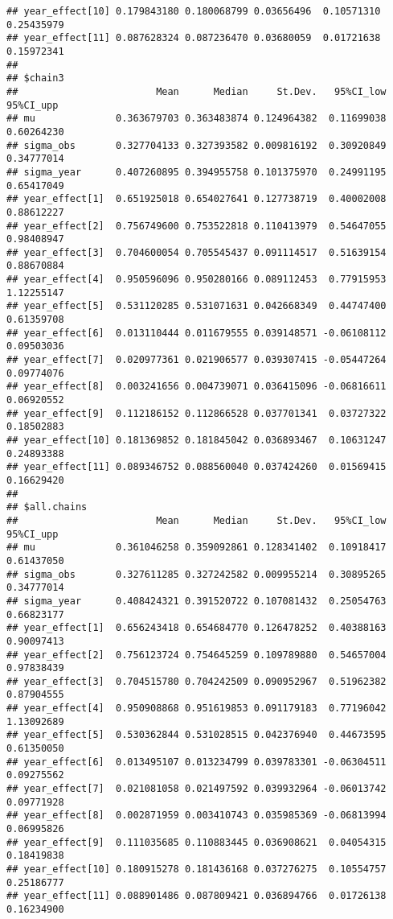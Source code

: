 \documentclass[
]{article}
\begin{document}
\begin{verbatim}
## year_effect[10] 0.179843180 0.180068799 0.03656496  0.10571310 0.25435979
## year_effect[11] 0.087628324 0.087236470 0.03680059  0.01721638 0.15972341
## 
## $chain3
##                        Mean      Median     St.Dev.   95%CI_low  95%CI_upp
## mu              0.363679703 0.363483874 0.124964382  0.11699038 0.60264230
## sigma_obs       0.327704133 0.327393582 0.009816192  0.30920849 0.34777014
## sigma_year      0.407260895 0.394955758 0.101375970  0.24991195 0.65417049
## year_effect[1]  0.651925018 0.654027641 0.127738719  0.40002008 0.88612227
## year_effect[2]  0.756749600 0.753522818 0.110413979  0.54647055 0.98408947
## year_effect[3]  0.704600054 0.705545437 0.091114517  0.51639154 0.88670884
## year_effect[4]  0.950596096 0.950280166 0.089112453  0.77915953 1.12255147
## year_effect[5]  0.531120285 0.531071631 0.042668349  0.44747400 0.61359708
## year_effect[6]  0.013110444 0.011679555 0.039148571 -0.06108112 0.09503036
## year_effect[7]  0.020977361 0.021906577 0.039307415 -0.05447264 0.09774076
## year_effect[8]  0.003241656 0.004739071 0.036415096 -0.06816611 0.06920552
## year_effect[9]  0.112186152 0.112866528 0.037701341  0.03727322 0.18502883
## year_effect[10] 0.181369852 0.181845042 0.036893467  0.10631247 0.24893388
## year_effect[11] 0.089346752 0.088560040 0.037424260  0.01569415 0.16629420
## 
## $all.chains
##                        Mean      Median     St.Dev.   95%CI_low  95%CI_upp
## mu              0.361046258 0.359092861 0.128341402  0.10918417 0.61437050
## sigma_obs       0.327611285 0.327242582 0.009955214  0.30895265 0.34777014
## sigma_year      0.408424321 0.391520722 0.107081432  0.25054763 0.66823177
## year_effect[1]  0.656243418 0.654684770 0.126478252  0.40388163 0.90097413
## year_effect[2]  0.756123724 0.754645259 0.109789880  0.54657004 0.97838439
## year_effect[3]  0.704515780 0.704242509 0.090952967  0.51962382 0.87904555
## year_effect[4]  0.950908868 0.951619853 0.091179183  0.77196042 1.13092689
## year_effect[5]  0.530362844 0.531028515 0.042376940  0.44673595 0.61350050
## year_effect[6]  0.013495107 0.013234799 0.039783301 -0.06304511 0.09275562
## year_effect[7]  0.021081058 0.021497592 0.039932964 -0.06013742 0.09771928
## year_effect[8]  0.002871959 0.003410743 0.035985369 -0.06813994 0.06995826
## year_effect[9]  0.111035685 0.110883445 0.036908621  0.04054315 0.18419838
## year_effect[10] 0.180915278 0.181436168 0.037276275  0.10554757 0.25186777
## year_effect[11] 0.088901486 0.087809421 0.036894766  0.01726138 0.16234900
\end{verbatim}
\end{document}
